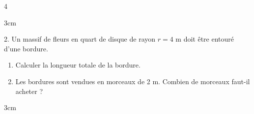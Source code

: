 \documentclass[a4paper]{book}
\begin{document}
{\begin{exerciceNote}{4}
\begin{minipage}{0.8\linewidth}
            \begin{ZoneReponse}{3cm}
            \end{ZoneReponse}
        \end{minipage}
        \hfill
        \begin{minipage}{0.15\linewidth}
        \end{minipage}

        \medskip

        \begin{minipage}{0.8\linewidth}
            2. Un massif de fleurs en quart de disque de rayon $r = 4$ m doit être entouré d'une bordure.
            \begin{enumerate}[leftmargin=*, label=\alph*.]
                \item Calculer la longueur totale de la bordure.
                \item Les bordures sont vendues en morceaux de 2 m. Combien de morceaux faut-il acheter ?
            \end{enumerate}

            \begin{ZoneReponse}{3cm}
            \end{ZoneReponse}
        \end{minipage}
        \hfill
        \begin{minipage}{0.15\linewidth}
        \end{minipage}        
    \end{exerciceNote}

}
\end{document}
